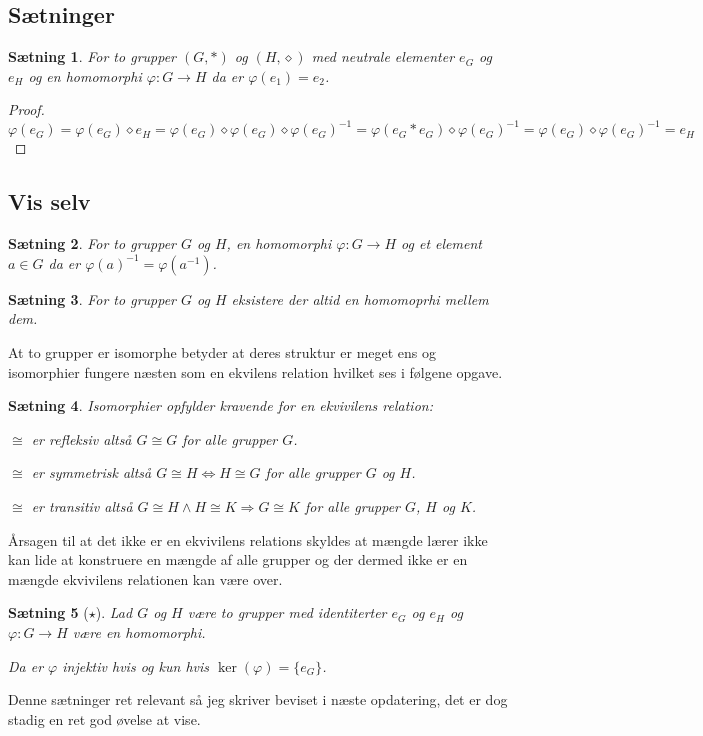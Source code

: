 \documentclass{article}
\newcommand{\inv}{^{-1}}
\newcommand{\imp}{\Rightarrow}
\newcommand{\biimp}{\Leftrightarrow}
\newcommand{\too}{\rightarrow}
\newtheorem{setn}{Sætning}
\begin{document}
		\subsection*{Sætninger}
		\begin{setn}
			For to grupper $(G,*)$ og $(H, \diamond)$ med neutrale elementer $e_G$ og $e_H$
			og en homomorphi $\varphi: G \too H$ da er $\varphi(e_1) = e_2$.
		\end{setn}
		\begin{proof}
			$$\varphi(e_G) = \varphi(e_G)\diamond e_H
			= \varphi(e_G)\diamond\varphi(e_G)\diamond\varphi(e_G)\inv
			= \varphi(e_G*e_G)\diamond\varphi(e_G)\inv
			= \varphi(e_G)\diamond\varphi(e_G)\inv = e_H$$
		\end{proof}
		\subsection*{Vis selv}
		\begin{setn}
			For to grupper $G$ og $H$, en homomorphi $\varphi: G \too H$
			og et element $a \in G$ da er $\varphi(a)\inv = \varphi(a\inv)$.
		\end{setn}
		\begin{setn}
			For to grupper $G$ og $H$ eksistere der altid en homomoprhi mellem dem.
		\end{setn}
		At to grupper er isomorphe betyder at deres struktur er meget ens og isomorphier
		fungere næsten som en ekvilens relation hvilket ses i følgene opgave.
		\begin{setn}
			Isomorphier opfylder kravende for en ekvivilens relation:

			$\cong$ er refleksiv altså $G \cong G$ for alle grupper $G$.

			$\cong$ er symmetrisk altså $G \cong H \biimp H \cong G$ for
			alle grupper $G$ og $H$.

			$\cong$ er transitiv altså $G \cong H \wedge H \cong K \imp G \cong K$
			for alle grupper $G$, $H$ og $K$.

		\end{setn}
		Årsagen til at det ikke er en ekvivilens relations skyldes at mængde lærer ikke
		kan lide at konstruere en mængde af alle grupper og der dermed ikke er en mængde
		ekvivilens relationen kan være over.
		\begin{setn}[$\star$] \label{KerInj}
			Lad $G$ og $H$ være to grupper med identiterter $e_G$ og $e_H$
			og $\varphi: G \too H$ være en homomorphi.

			Da er $\varphi$ injektiv hvis og kun hvis $\ker(\varphi) = \{e_G\}$.
		\end{setn}
		Denne sætninger ret relevant så jeg skriver beviset i næste opdatering, det er
		dog stadig en ret god øvelse at vise.
	\newpage
\end{document}
